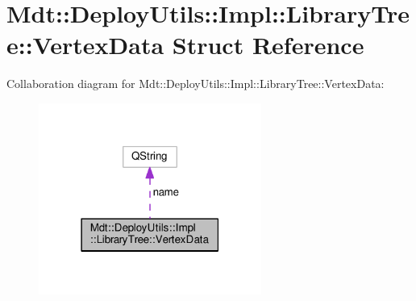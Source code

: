 \hypertarget{struct_mdt_1_1_deploy_utils_1_1_impl_1_1_library_tree_1_1_vertex_data}{}\section{Mdt\+:\+:Deploy\+Utils\+:\+:Impl\+:\+:Library\+Tree\+:\+:Vertex\+Data Struct Reference}
\label{struct_mdt_1_1_deploy_utils_1_1_impl_1_1_library_tree_1_1_vertex_data}


Collaboration diagram for Mdt\+:\+:Deploy\+Utils\+:\+:Impl\+:\+:Library\+Tree\+:\+:Vertex\+Data\+:
\nopagebreak
\begin{figure}[H]
\begin{center}
\leavevmode
\includegraphics[width=207pt]{struct_mdt_1_1_deploy_utils_1_1_impl_1_1_library_tree_1_1_vertex_data__coll__graph}
\end{center}
\end{figure}
